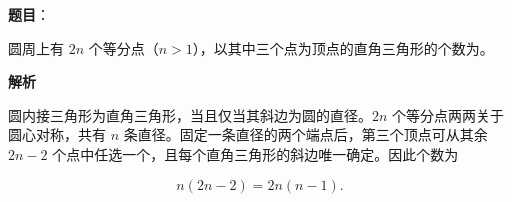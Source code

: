 \begin{answer}

\textbf{题目}：

圆周上有 $2n$ 个等分点（$n>1$），以其中三个点为顶点的直角三角形的个数为\gkblank{}。

\textbf{解析}

圆内接三角形为直角三角形，当且仅当其斜边为圆的直径。$2n$ 个等分点两两关于圆心对称，共有 $n$ 条直径。固定一条直径的两个端点后，第三个顶点可从其余 $2n-2$ 个点中任选一个，且每个直角三角形的斜边唯一确定。因此个数为

\nopagebreak[4]
\[
n(2n-2)=2n(n-1).
\]


\end{answer}

